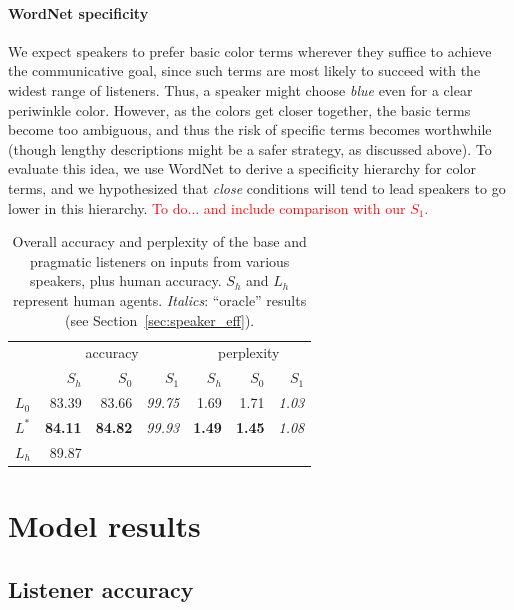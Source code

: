 \documentclass[11pt,letterpaper]{article}
\newcommand{\word}{\textit}
\newcommand{\Listener}{L}
\newcommand{\Speaker}{S}
\renewcommand{\|}{\mid}
\newcommand{\best}[1]{\textbf{#1}}
\newcommand{\oracle}[1]{\textit{#1}}
\newcommand{\secref}[1]{Section~\ref{#1}}
\newcommand{\todocheck}[1]{\textcolor{red}{#1}}
\newcommand{\cond}{\emph}
\begin{document}
\paragraph{WordNet specificity}
We expect speakers to prefer basic color terms wherever they suffice
to achieve the communicative goal, since such terms are most likely to
succeed with the widest range of listeners. Thus, a speaker might
choose \word{blue} even for a clear periwinkle color. However, as the
colors get closer together, the basic terms become too ambiguous, and
thus the risk of specific terms becomes worthwhile (though lengthy
descriptions might be a safer strategy, as discussed above). To
evaluate this idea, we use WordNet \cite{Fellbaum1998} to derive a
specificity hierarchy for color terms, and we hypothesized that
\cond{close} conditions will tend to lead speakers to go lower in this
hierarchy. \todocheck{To do... and include comparison with our $\Speaker_{1}$.}

\begin{table}[t]
\centering
\begin{tabular}{lrrrrrr}
  \toprule
   & \multicolumn{3}{c}{accuracy} & \multicolumn{3}{c}{perplexity} \\
   & $\Speaker_h$ & $\Speaker_0$ & $\Speaker_1$ & $\Speaker_h$ & $\Speaker_0$ & $\Speaker_1$ \\
  \midrule
  $\Listener_0$ & 83.39 & 83.66 & \oracle{99.75} & 1.69 & 1.71 & \oracle{1.03} \\
  $\Listener^*$ & \best{84.11} & \best{84.82} & \oracle{99.93} & \best{1.49} & \best{1.45} & \oracle{1.08}
  \\[0.5ex]
  $\Listener_h$ & 89.87 \\
   \bottomrule
\end{tabular}
\caption{Overall accuracy and perplexity of the base and pragmatic listeners
on inputs from various speakers, plus human accuracy. $\Speaker_h$ and $\Listener_h$
represent human agents. \oracle{Italics}: ``oracle'' results (see \secref{sec:speaker_eff}).}
\label{table:speakerVsListener}
\end{table}

\section{Model results}

\subsection{Listener accuracy}
\end{document}
